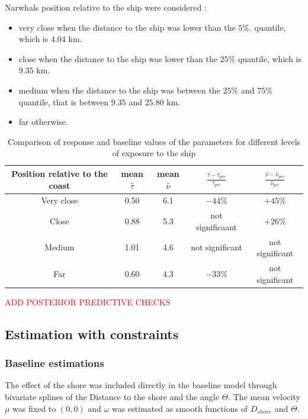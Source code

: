 \documentclass[11pt]{article}
\newcommand {\1}{\mathbb{1}}
\begin{document}
Narwhals position relative to the ship were considered :
\begin{itemize}
	\item very close when the distance to the ship was lower than the $5\%$. quantile, which is $4.04$ km.
	\item close when the distance to the ship was lower than the $25\%$ quantile, which is $9.35$ km.
	\item medium when the distance to the ship was between the $25\%$ and $75\%$ quantile, that is between $9.35$ and $25.80$ km.
	\item far otherwise.
\end{itemize}
\begin{table}[H]
	\centering
\begin{tabular}{|c|c|c|c|c|}
	\hline
	Position relative to the coast & mean $\hat{\tau}$  & mean $\hat{\nu}$ & $\frac{\hat{\tau}-\hat{\tau}_{pre}}{\tau_{pre}}$ & $\frac{\hat{\nu}-\hat{\nu}_{pre}}{\hat{\nu}_{pre}}$   \\
	\hline
	Very close & 0.50 & 6.1 & $-44 \%$ & $+45 \%$ \\
	\hline
	Close & 0.88 & 5.3 & not significaant & $+26\%$ \\
	\hline
	Medium&  1.01 &  4.6 &  not significant & not significant \\
	\hline
	Far &  0.60 & 4.3 & $-33\%$ & not significant \\
	\hline
\end{tabular}
\caption{Comparison of response and baseline values of the parameters for different levels of exposure to the ship}
\label{table: baseline vs response parameters comparison}
\end{table}

\textcolor{red}{ADD POSTERIOR PREDICTIVE CHECKS}

\subsection{Estimation with constraints}



\subsubsection{Baseline estimations}

The effect of the shore was included directly in the baseline model through bivariate splines of the Distance to the shore and the angle $\Theta$.
The mean velocity $\mu$ was fixed to $(0,0)$ and $\omega$ was estimated as smooth functions of $D_{shore}$ and $\Theta$.
\end{document}
